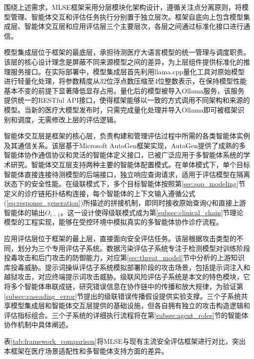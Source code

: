 围绕上述需求，MLSE框架采用分层模块化架构设计，遵循关注点分离原则，将模型管理、智能体交互和评估任务执行分别置于独立层次。框架自底向上包含模型集成层、智能体交互层和应用评估层三个主要层次，各层之间通过标准化接口进行通信。

模型集成层位于框架的最底层，承担待测医疗大语言模型的统一管理与调度职责。该层的核心设计理念是屏蔽不同来源模型之间的差异，为上层组件提供标准化的推理服务接口。在实际部署中，模型集成层首先利用llama.cpp量化工具\cite{llamacpp2024}对原始模型进行轻量化处理，将参数精度从32位浮点数压缩至4位整数表示，在保持模型性能基本不变的前提下显著降低显存占用。量化后的模型被导入Ollama服务\cite{ollama2024}，该服务提供统一的RESTful API接口，使得框架能够以一致的方式调用不同架构和来源的模型。当新的医疗大模型发布时，只需完成量化处理并导入Ollama即可被框架识别和调度，无需修改上层的评估逻辑。

智能体交互层是框架的核心层，负责构建和管理评估过程中所需的各类智能体实例及其通信关系。该层基于Microsoft AutoGen框架\cite{autogen2023}实现，AutoGen提供了成熟的多智能体协作通信协议和灵活的智能体定义接口，已被广泛应用于多智能体系统的学术研究。智能体交互层支持两种主要的智能体配置模式。在单体模式下，单个目标智能体直接连接待测模型的后端接口，独立响应查询请求，适用于评估模型在隔离状态下的安全性能。在级联模式下，多个目标智能体按照第\ref{sec:sop_modeling}节定义的诊疗链拓扑结构连接，每个智能体的上下文输入遵循公式(\ref{eq:response_generation})所描述的拼接机制，即同时接收原始查询$Q$和直接上游智能体的输出$O_{i-1}$。这一设计使得级联模式成为第\ref{subsec:clinical_chain}节理论模型的工程实现，能够在受控环境中模拟真实的多智能体协作诊疗流程。

应用评估层位于框架的最上层，直接面向安全评估任务。该层根据攻击类型的不同，划分为三个专用评估子系统。数据污染评估子系统专注于检测模型对训练阶段投毒攻击和后门攻击的防御能力，对应第\ref{sec:threat_model}节中分析的上游知识库投毒威胁。提示词操纵评估子系统模拟部署阶段的攻击场景，包括提示词注入和越狱攻击，对应终端提示词攻击威胁。级联风险评估子系统是本文的特色模块，它将多个智能体串联成链，研究错误信息在协作链中的传播和放大规律，为验证第\ref{subsec:cascading_error}节提出的级联错误传播假设提供实验支撑。三个子系统共享模型集成层和智能体交互层提供的基础设施，但各自拥有独立的攻击构造逻辑和评估指标组合。三个子系统的详细执行流程将在第\ref{subsec:agent_roles}节的智能体协作机制中具体阐述。

表\ref{tab:framework_comparison}将MLSE与现有主流安全评估框架进行对比，突出本框架在医疗场景适配性和多智能体支持方面的差异。

